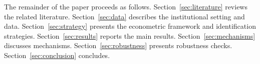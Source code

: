 The remainder of the paper proceeds as follows. Section~\ref{sec:literature} reviews the related literature. Section~\ref{sec:data} describes the institutional setting and data. Section~\ref{sec:strategy} presents the econometric framework and identification strategies. Section~\ref{sec:results} reports the main results. Section~\ref{sec:mechanisms} discusses mechanisms. Section~\ref{sec:robustness} presents robustness checks. Section~\ref{sec:conclusion} concludes.
